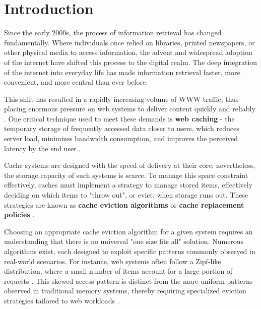 \chapter{Introduction}


Since the early 2000s, the process of information retrieval has changed fundamentally. Where individuals once relied on libraries, printed newspapers, or other physical media to access information, the advent and widespread adoption of the internet have shifted this process to the digital realm. The deep integration of the internet into everyday life has made information retrieval faster, more convenient, and more central than ever before.

This shift has resulted in a rapidly increasing volume of WWW traffic, thus placing enormous pressure on web systems to deliver content quickly and reliably \cite{web-cache-overview}. One critical technique used to meet these demands is \textbf{web caching} - the temporary storage of frequently accessed data closer to users, which reduces server load, minimizes bandwidth consumption, and improves the perceived latency by the end user \cite{web-cache-performance, web-cache-overview}.



Cache systems are designed with the speed of delivery at their core; nevertheless, the storage capacity of such systems is scarce. To manage this space constraint effectively, caches must implement a strategy to manage stored items, effectively deciding on which items to "throw out", or evict, when storage runs out. These strategies are known as \textbf{cache eviction algorithms} or \textbf{cache replacement policies} \cite{web-cache-overview}.


Choosing an appropriate cache eviction algorithm for a given system requires an understanding that there is no universal "one size fits all" solution. Numerous algorithms exist, each designed to exploit specific patterns commonly observed in real-world scenarios. For instance, web systems often follow a Zipf-like distribution, where a small number of items account for a large portion of requests \cite{sieve, web-cache-overview}. This skewed access pattern is distinct from the more uniform patterns observed in traditional memory systems, thereby requiring specialized eviction strategies tailored to web workloads \cite{web-cache-overview}.

